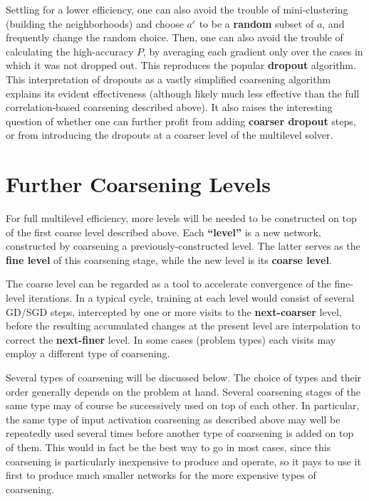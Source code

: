\documentclass{article} %
\begin{document}
Settling for a lower efficiency, one can also avoid the trouble of mini-clustering (building the neighborhoods) and choose $a^c$ to be a \textbf{random} subset of $a$, and frequently change the random choice. Then, one can also avoid the trouble of calculating the high-accuracy $P$, by averaging each gradient only over the cases in which it was not dropped out. This reproduces the popular \textbf{dropout} algorithm. This interpretation of dropouts as a vastly simplified coarsening algorithm explains its evident effectiveness (although likely much less effective than the full correlation-based coarsening described above). It also raises the interesting question of whether one can further profit from adding \textbf{coarser dropout} steps, or from introducing the dropouts at a coarser level of the multilevel solver.
 
\section{Further Coarsening Levels}
\label{sec:further_coarsening}
For full multilevel efficiency, more levels will be needed to be constructed on top of the first coarse level described above. Each \textbf{``level''} is a new network, constructed by coarsening a previously-constructed level. The latter serves as the \textbf{fine level} of this coarsening stage, while the new level is its \textbf{coarse level}.

The coarse level can be regarded as a tool to accelerate convergence of the fine-level iterations. In a typical cycle, training at each level would consist of several GD/SGD steps, intercepted by one or more visits to the \textbf{next-coarser} level, before the resulting accumulated changes at the present level are interpolation to correct the \textbf{next-finer} level. In some cases (problem types) each visits may employ a different type of coarsening.

Several types of coarsening will be discussed below. The choice of types and their order generally depends on the problem at hand.  Several coarsening stages of the same type may of course be successively used on top of each other. In particular, the same type of input activation coarsening as described above may well be repeatedly used several times before another type of coarsening is added on top of them. This would in fact be the best way to go in most cases, since this coarsening is particularly inexpensive to produce and operate, so it pays to use it first to produce much smaller networks for the more expensive types of coarsening.
\end{document}
